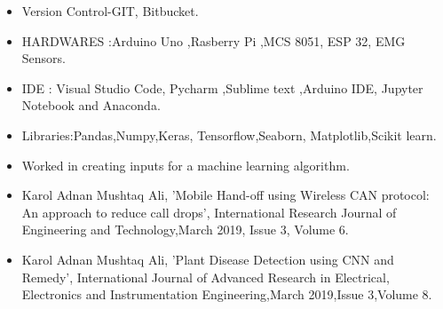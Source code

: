     \begin{itemize}
    \item Version Control-GIT, Bitbucket.
    \item HARDWARES :Arduino Uno ,Rasberry Pi ,MCS 8051, ESP 32, EMG Sensors.
     \item  IDE : Visual Studio Code, Pycharm ,Sublime text ,Arduino IDE, Jupyter Notebook and Anaconda.
     \item Libraries:Pandas,Numpy,Keras,
     Tensorflow,Seaborn,
     Matplotlib,Scikit learn.
\end{itemize}









\divider



\begin{itemize}
\item Worked in creating inputs for a machine learning algorithm.

\end{itemize}





\begin{itemize}
    \item Karol Adnan Mushtaq Ali, 'Mobile Hand-off using Wireless CAN protocol: An approach to reduce call drops', International
Research Journal of Engineering and Technology,March 2019, Issue 3, Volume 6.
    \item Karol Adnan Mushtaq Ali, 'Plant Disease Detection using CNN and Remedy', International Journal of Advanced Research in
Electrical, Electronics and Instrumentation Engineering,March 2019,Issue 3,Volume 8.


   
\end{itemize}


